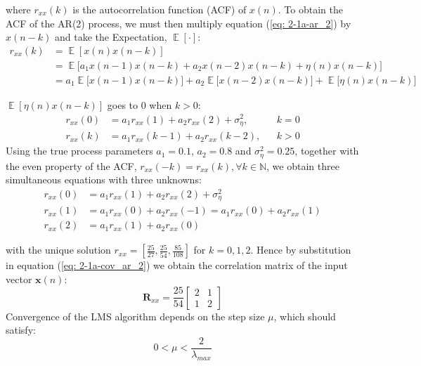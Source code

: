 \documentclass[12pt]{article}
\numberwithin{equation}{section}
\DeclareMathOperator*{\E}{\mathbb{E}}
\def\setNatural{{\mathbb{N}}}
\begin{document}
			where $r_{xx}(k)$ is the autocorrelation function (ACF) of $x(n)$. To obtain the ACF of the AR(2) process, we must then multiply equation (\ref{eq: 2-1a-ar_2}) by $x(n-k)$ and take the Expectation, $\E[\cdot]$:
			\begin{align}
			r_{xx}(k) &= \E[ x(n) x(n-k) ] \nonumber\\
			  		  &= \E \bigg[ a_{1} x(n - 1) x(n-k) + a_{2} x(n - 2) x(n-k) + \eta(n) x(n-k) \bigg] \nonumber\\
			  		  &= a_{1} \E \big[ x(n - 1) x(n-k) \big] + a_{2} \E \big[ x(n - 2) x(n-k) \big] + \E \big[ \eta(n) x(n-k) \big]
			\end{align}
			
			$\E [\eta(n) x(n-k)]$ goes to $0$ when $k > 0$: 
			\vspace*{-0.2\baselineskip}
			\begin{align}
			r_{xx}(0)   &= a_{1} r_{xx}(1) + a_{2} r_{xx}(2) + \sigma_{\eta}^{2},  && k = 0 \\
			r_{xx}(k)   &= a_{1} r_{xx}(k-1) + a_{2} r_{xx}(k-2),   && k > 0
			\label{eq: 2-1a-acf_ar_2}
			\end{align}
			\noindent
			Using the true process parameters $a_{1} = 0.1$, $a_{2} = 0.8$ and $\sigma_{\eta}^{2} = 0.25$, together with the even property of the ACF, $r_{xx}(-k) = r_{xx}(k), \forall k \in \setNatural$, we obtain three simultaneous equations with three unknowns:
			\vspace*{-\baselineskip}
			\begin{align}
			r_{xx}(0)   &= a_{1} r_{xx}(1) + a_{2} r_{xx}(2) + \sigma_{\eta}^{2} \\
			r_{xx}(1)   &= a_{1} r_{xx}(0) + a_{2} r_{xx}(-1) = a_{1} r_{xx}(0) + a_{2} r_{xx}(1) \\
			r_{xx}(2)   &= a_{1} r_{xx}(1) + a_{2} r_{xx}(0)
			\end{align}
			
			with the unique solution $r_{xx} = [\frac{25}{27}, \frac{25}{54}, \frac{85}{108}]$ for $k=0, 1, 2$. \newline
			\noindent
			Hence by substitution in equation (\ref{eq: 2-1a-cov_ar_2}) we obtain the  correlation matrix of the input vector $\mathbf{x}(n)$:
			\begin{equation}
			\mathbf{R}_{xx} = 
			\frac{25}{54}
			\begin{bmatrix}
			2 & 1 \\
			1 & 2
			\end{bmatrix}
			\label{eq: 2-1a-cov_ar_2_result}
			\end{equation}
			\noindent
			Convergence of the LMS algorithm depends on the step size $\mu$, which should satisfy:
			\begin{equation}
			0 < \mu < \frac{2}{\lambda_{max}}
			\label{eq: 2-1a-cond:mu_max}
			\end{equation}
			
\end{document}
